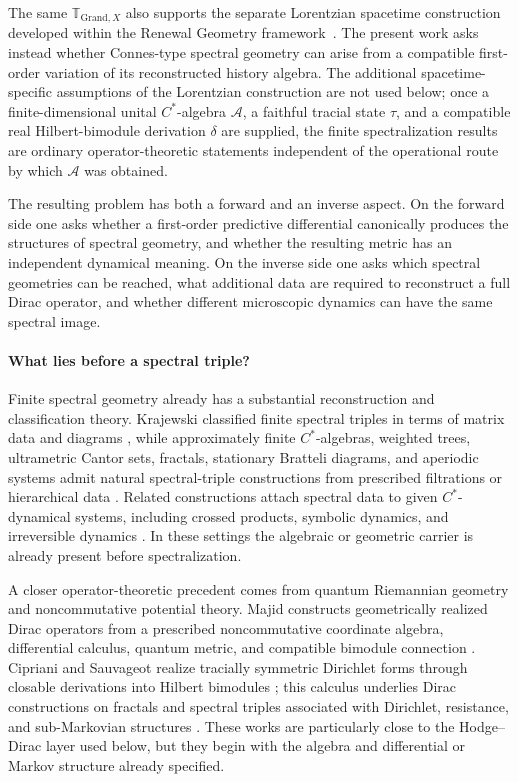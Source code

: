 \documentclass[11pt]{article}
\theoremstyle{definition}
\theoremstyle{remark}
\theoremstyle{definition}
\theoremstyle{remark}
\newcommand{\A}{\mathcal A}
\newcommand{\GTX}{\boldsymbol{\mathbb T}_{\mathrm{Grand},X}}
\begin{document}
The same $\GTX$ also supports the separate Lorentzian spacetime construction
developed within the Renewal Geometry framework~\cite{PelissierRenewalSpacetime2026}.
The present work asks instead whether
Connes-type spectral geometry can arise from a compatible first-order variation
of its reconstructed history algebra.  The additional spacetime-specific assumptions of the Lorentzian construction
are not used below; once a finite-dimensional unital $C^*$-algebra $\A$, a
faithful tracial state $\tau$, and a compatible real Hilbert-bimodule derivation
$\delta$ are supplied, the finite spectralization results are ordinary
operator-theoretic statements independent of the operational route by which
$\A$ was obtained.

The resulting problem has both a forward and an inverse aspect. On the forward
side one asks whether a first-order predictive differential canonically produces
the structures of spectral geometry, and whether the resulting metric has an
independent dynamical meaning. On the inverse side one asks which spectral
geometries can be reached, what additional data are required to reconstruct a
full Dirac operator, and whether different microscopic dynamics can have the same
spectral image.

\paragraph{What lies before a spectral triple?}

Finite spectral geometry already has a substantial reconstruction and
classification theory.  Krajewski classified finite spectral triples in terms of
matrix data and diagrams \cite{Krajewski1998}, while approximately finite
$C^*$-algebras, weighted trees, ultrametric Cantor sets, fractals, stationary
Bratteli diagrams, and aperiodic systems admit natural spectral-triple
constructions from prescribed filtrations or hierarchical data
\cite{ChristensenIvan2006,PearsonBellissard2009,
ChristensenIvanSchrohe2012,KellendonkSavinien2012}.  Related constructions attach
spectral data to given $C^*$-dynamical systems, including crossed products,
symbolic dynamics, and irreversible dynamics
\cite{Paterson2014,JulienPutnam2016,AielloGuidoIsola2022}.  In these settings the
algebraic or geometric carrier is already present before spectralization.

A closer operator-theoretic precedent comes from quantum Riemannian geometry and
noncommutative potential theory.  Majid constructs geometrically realized Dirac
operators from a prescribed noncommutative coordinate algebra, differential
calculus, quantum metric, and compatible bimodule connection \cite{Majid2025}.
Cipriani and Sauvageot realize tracially symmetric Dirichlet forms through
closable derivations into Hilbert bimodules \cite{CiprianiSauvageot2003}; this
calculus underlies Dirac constructions on fractals and spectral triples associated
with Dirichlet, resistance, and sub-Markovian structures
\cite{HinzTeplyaev2013,HinzKelleherTeplyaev2015,Cipriani2016,Arhancet2024}.
These works are particularly close to the Hodge--Dirac layer used below, but they
begin with the algebra and differential or Markov structure already specified.
\end{document}
